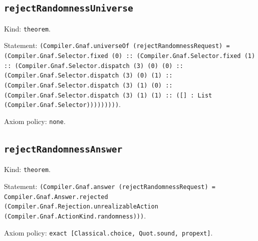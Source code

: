 \documentclass[11pt]{article}
\begin{document}
\subsection*{\texttt{rejectRandomnessUniverse}}
\noindent Kind: \texttt{theorem}.\par
\noindent Statement: \texttt{(Compiler.Gnaf.universeOf (rejectRandomnessRequest) = (Compiler.Gnaf.Selector.fixed (0) :: (Compiler.Gnaf.Selector.fixed (1) :: (Compiler.Gnaf.Selector.dispatch (3) (0) (0) :: (Compiler.Gnaf.Selector.dispatch (3) (0) (1) :: (Compiler.Gnaf.Selector.dispatch (3) (1) (0) :: (Compiler.Gnaf.Selector.dispatch (3) (1) (1) :: ([] : List (Compiler.Gnaf.Selector)))))))))}.\par
\noindent Axiom policy: \texttt{none}.\par
\subsection*{\texttt{rejectRandomnessAnswer}}
\noindent Kind: \texttt{theorem}.\par
\noindent Statement: \texttt{(Compiler.Gnaf.answer (rejectRandomnessRequest) = Compiler.Gnaf.Answer.rejected (Compiler.Gnaf.Rejection.unrealizableAction (Compiler.Gnaf.ActionKind.randomness)))}.\par
\noindent Axiom policy: \texttt{exact [Classical.choice, Quot.sound, propext]}.\par
\end{document}
